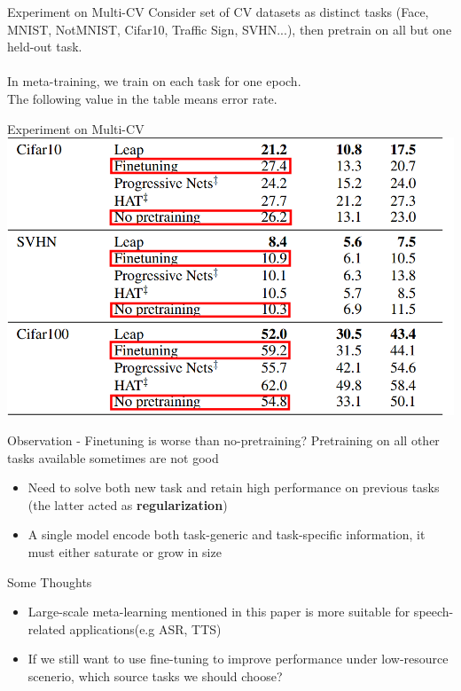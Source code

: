 \documentclass{beamer}
\begin{document}
\begin{frame}{Experiment on Multi-CV}
  Consider set of CV datasets as distinct tasks (Face, MNIST, NotMNIST, Cifar10, Traffic Sign, SVHN...), then pretrain on all but one held-out task.\\ 
  $\quad$\\ 
  In meta-training, we train on each task for one epoch.\\
  The following value in the table means error rate.
\end{frame}

\begin{frame}{Experiment on Multi-CV}
  \includegraphics[width=\textwidth]{fig/p1-MultiCV.png}
\end{frame}

\begin{frame}{Observation - Finetuning is worse than no-pretraining?}
  Pretraining on all other tasks available sometimes are not good

  \begin{itemize}
    \item Need to solve both new task and retain high performance on previous tasks (the latter acted as \textbf{regularization})
    \item A single model encode both task-generic and task-specific information,
      it must either saturate or grow in size
  \end{itemize}
\end{frame}

\begin{frame}{Some Thoughts}
  \begin{itemize}
    \item Large-scale meta-learning mentioned in this paper is more suitable for speech-related applications(e.g ASR, TTS)
    \item If we still want to use fine-tuning to improve performance under low-resource scenerio, which source tasks we should choose? 
  \end{itemize}
\end{frame}
\end{document}
